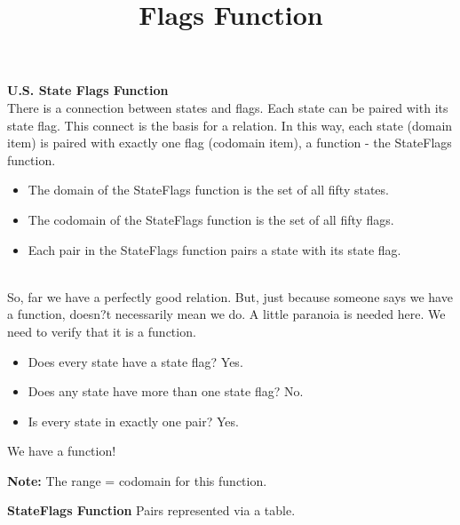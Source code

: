 \documentclass{ximera}
\title{Flags Function}
\begin{document}
\begin{abstract}
\end{abstract}

\maketitle




\textbf{U.S. State Flags Function} \\

There is a connection between states and flags.  Each state can be paired with its state flag.  This connect is the basis for a relation.
In this way, each state (domain item) is paired with exactly one flag (codomain item), a function - the StateFlags function.


\begin{definition} 
\begin{itemize}
\item The domain of the StateFlags function is the set of all fifty states.
\item The codomain of the StateFlags function is the set of all fifty flags.
\item Each pair in the StateFlags function pairs a state with its state flag.
\end{itemize}
\end{definition}
\quad \\

So, far we have a perfectly good relation. But, just because someone says we have a function, doesn?t necessarily mean we do.  A little paranoia is needed here. We need to verify that it is a function.

\begin{itemize}
\item Does every state have a state flag?  Yes.
\item Does any state have more than one state flag?  No.
\item Is every state in exactly one pair?  Yes.
\end{itemize}


We have a function! 

\textbf{Note:}  The range = codomain for this function.




\begin{center}
\textbf{StateFlags Function}
Pairs represented via a table.
\end{center}
\end{document}
